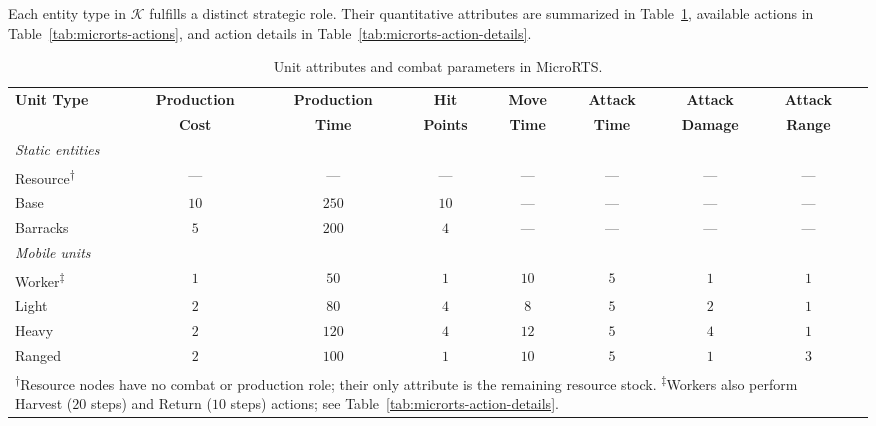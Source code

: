 Each entity type in $\mathcal{K}$ fulfills a distinct strategic role. Their quantitative attributes are summarized in Table~\ref{tab:microrts-units}, available actions in Table~\ref{tab:microrts-actions}, and action details in Table~\ref{tab:microrts-action-details}.

\begin{table}[!htp]
\centering
\small

\caption[Unit attributes and combat parameters in MicroRTS]{Unit attributes and combat parameters in MicroRTS.\footnotemark}
\label{tab:microrts-units}
\begin{tabularx}{\textwidth}{Xcccccccc}
\toprule
\textbf{Unit Type} & \textbf{Production} & \textbf{Production} & \textbf{Hit} & \textbf{Move} & \textbf{Attack} & \textbf{Attack} & \textbf{Attack} \\
 & \textbf{Cost} & \textbf{Time} & \textbf{Points} & \textbf{Time} & \textbf{Time} & \textbf{Damage} & \textbf{Range} \\
\midrule
\multicolumn{8}{l}{\textit{Static entities}} \\
\midrule
Resource\textsuperscript{$\dagger$} & — & — & — & — & — & — & — \\
Base & $10$ & $250$ & $10$ & — & — & — & — \\
Barracks & $5$ & $200$ & $4$ & — & — & — & — \\
\midrule
\multicolumn{8}{l}{\textit{Mobile units}} \\
\midrule
Worker\textsuperscript{$\ddagger$} & $1$ & $50$ & $1$ & $10$ & $5$ & $1$ & $1$ \\
Light & $2$ & $80$ & $4$ & $8$ & $5$ & $2$ & $1$ \\
Heavy & $2$ & $120$ & $4$ & $12$ & $5$ & $4$ & $1$ \\
Ranged & $2$ & $100$ & $1$ & $10$ & $5$ & $1$ & $3$ \\
\bottomrule
\multicolumn{8}{p{\textwidth}}{\footnotesize 
    \textsuperscript{$\dagger$}Resource nodes have no combat or production role; their only attribute is the remaining resource stock. \newline
    \textsuperscript{$\ddagger$}Workers also perform Harvest ($20$ steps) and Return ($10$ steps) actions; see Table~\ref{tab:microrts-action-details}.} \\
\end{tabularx}

\vspace{3em}


\end{table}
